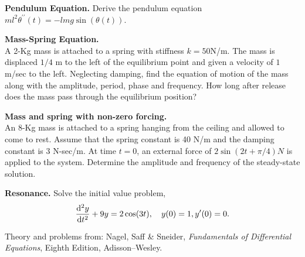 \documentclass[11pt]{article}
\begin{document}
\makelabtitle



\begin{problem}
{\bf Pendulum Equation.} Derive the pendulum equation $ m l^2 \theta^{\prime \prime}(t) = -l m g \sin(\theta(t))$.
\end{problem}


\begin{problem}
\textbf{Mass-Spring Equation.} \\
A 2-Kg mass is attached to a spring with stiffness $k = 50$N/m. The mass is displaced $1/4$ m to the left of the equilibrium point and given a velocity of $1$m/sec to the left. Neglecting damping, find the equation of motion of the mass along with the amplitude, period, phase and frequency. How long after release does the mass pass through the equilibrium position?
\end{problem}


\begin{problem}
\textbf{Mass and spring with non-zero forcing.} \\
An 8-Kg mass is attached to a spring hanging from the ceiling and allowed to come to rest. Assume that the spring constant is 40 N/m and the damping constant is 3 N-sec/m. At time $t=0$, an external force of $2\sin(2t +\pi/4)N$ is applied to the system. Determine the amplitude and frequency of the steady-state solution.
\end{problem}


\begin{problem}
{\bf Resonance.} Solve the initial value problem,
\begin{equation*}
\dfrac{{\rm d}^2 y}{{\rm d} t^2} + 9y = 2 \cos(3t), \quad y(0) =1 , y^{\prime}(0) =0.
\end{equation*}
\end{problem}











\LabSolutions




Theory and problems from: Nagel, Saff \& Sneider, \textit{Fundamentals of Differential Equations}, Eighth Edition, Adisson--Wesley.
\end{document}
